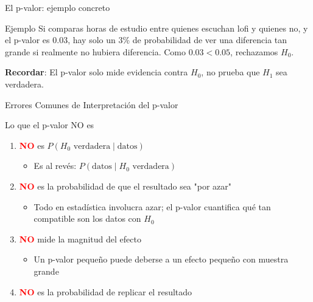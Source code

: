 \documentclass[aspectratio=169, 11pt]{beamer}
\begin{document}
\begin{frame}{El p-valor: ejemplo concreto}
\begin{exampleblock}{Ejemplo}
Si comparas horas de estudio entre quienes escuchan lofi y quienes no, y el p-valor es 0.03, hay solo un 3\% de probabilidad de ver una diferencia tan grande \alert{si realmente no hubiera diferencia}. Como $0.03 < 0.05$, rechazamos $H_0$.
\end{exampleblock}

\vspace{0.3cm}
\textbf{Recordar}: El p-valor solo mide evidencia contra $H_0$, no prueba que $H_1$ sea verdadera.
\end{frame}

\begin{frame}{Errores Comunes de Interpretación del p-valor}
\begin{alertblock}{Lo que el p-valor NO es}
\begin{enumerate}
  \item \textcolor{red}{\textbf{NO}} es $P(H_0 \text{ verdadera} \mid \text{datos})$
  \begin{itemize}
    \item Es al revés: $P(\text{datos} \mid H_0 \text{ verdadera})$
  \end{itemize}

  \item \textcolor{red}{\textbf{NO}} es la probabilidad de que el resultado sea "por azar"
  \begin{itemize}
    \item Todo en estadística involucra azar; el p-valor cuantifica qué tan compatible son los datos con $H_0$
  \end{itemize}

  \item \textcolor{red}{\textbf{NO}} mide la magnitud del efecto
  \begin{itemize}
    \item Un p-valor pequeño puede deberse a un efecto pequeño con muestra grande
  \end{itemize}

  \item \textcolor{red}{\textbf{NO}} es la probabilidad de replicar el resultado
\end{enumerate}
\end{alertblock}
\end{frame}
\end{document}

